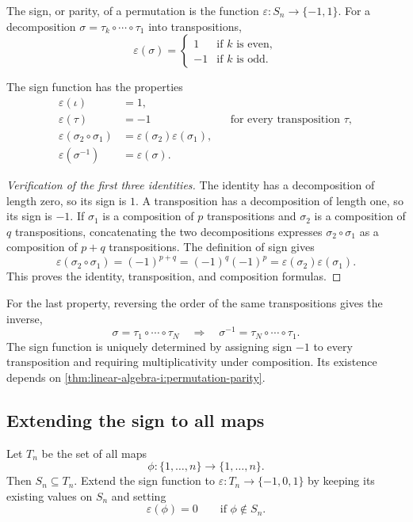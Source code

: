 \begin{definition}
  The sign, or parity, of a permutation is the function
  \(\varepsilon:S_n\to\{-1,1\}\). For a decomposition
  \(\sigma=\tau_k\circ\cdots\circ\tau_1\) into transpositions,
  \[
    \varepsilon(\sigma)=
    \begin{cases}
      1 & \text{if \(k\) is even},\\
      -1 & \text{if \(k\) is odd}.
    \end{cases}
  \]
\end{definition}

The sign function has the properties
\[
  \begin{aligned}
    \varepsilon(\iota)&=1,\\
    \varepsilon(\tau)&=-1 &&\text{for every transposition \(\tau\)},\\
    \varepsilon(\sigma_2\circ\sigma_1)
      &=\varepsilon(\sigma_2)\varepsilon(\sigma_1),\\
    \varepsilon(\sigma^{-1})&=\varepsilon(\sigma).
  \end{aligned}
\]
\begin{pendingreview}
\begin{proof}[Verification of the first three identities]
  The identity has a decomposition of length zero, so its sign is \(1\).
  A transposition has a decomposition of length one, so its sign is \(-1\).
  If \(\sigma_1\) is a composition of \(p\) transpositions and
  \(\sigma_2\) is a composition of \(q\) transpositions, concatenating
  the two decompositions expresses \(\sigma_2\circ\sigma_1\) as a
  composition of \(p+q\) transpositions. The definition of sign gives
  \[
    \varepsilon(\sigma_2\circ\sigma_1)
      =(-1)^{p+q}=(-1)^q(-1)^p
      =\varepsilon(\sigma_2)\varepsilon(\sigma_1).
  \]
  This proves the identity, transposition, and composition formulas.
\end{proof}
\end{pendingreview}

For the last property, reversing the order of the same transpositions gives
the inverse,
\[
  \sigma=\tau_1\circ\cdots\circ\tau_N
  \quad\Longrightarrow\quad
  \sigma^{-1}=\tau_N\circ\cdots\circ\tau_1.
\]
The sign function is uniquely determined by assigning sign \(-1\) to
every transposition and requiring multiplicativity under composition.
Its existence depends on \autoref{thm:linear-algebra-i:permutation-parity}.

\subsection{Extending the sign to all maps}

Let \(T_n\) be the set of all maps
\[
  \phi:\{1,\ldots,n\}\longrightarrow\{1,\ldots,n\}.
\]
Then \(S_n\subseteq T_n\). Extend the sign function to
\(\varepsilon:T_n\to\{-1,0,1\}\) by keeping its existing values on
\(S_n\) and setting
\[
  \varepsilon(\phi)=0\qquad\text{if \(\phi\notin S_n\)}.
\]
